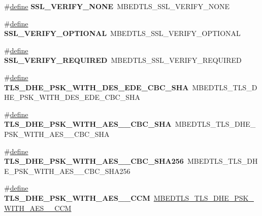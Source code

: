 \begin{DoxyCompactItemize}
\#\hyperlink{structdefine}{define} {\bfseries S\+S\+L\+\_\+\+V\+E\+R\+I\+F\+Y\+\_\+\+N\+O\+NE}~M\+B\+E\+D\+T\+L\+S\+\_\+\+S\+S\+L\+\_\+\+V\+E\+R\+I\+F\+Y\+\_\+\+N\+O\+NE
\item 
\mbox{\label{compat-1_83_8h_a7760ecdb03ee6f4520a21c04942c0883}} 
\#\hyperlink{structdefine}{define} {\bfseries S\+S\+L\+\_\+\+V\+E\+R\+I\+F\+Y\+\_\+\+O\+P\+T\+I\+O\+N\+AL}~M\+B\+E\+D\+T\+L\+S\+\_\+\+S\+S\+L\+\_\+\+V\+E\+R\+I\+F\+Y\+\_\+\+O\+P\+T\+I\+O\+N\+AL
\item 
\mbox{\label{compat-1_83_8h_a1f9549da00fa29209b3db3c5f11a329b}} 
\#\hyperlink{structdefine}{define} {\bfseries S\+S\+L\+\_\+\+V\+E\+R\+I\+F\+Y\+\_\+\+R\+E\+Q\+U\+I\+R\+ED}~M\+B\+E\+D\+T\+L\+S\+\_\+\+S\+S\+L\+\_\+\+V\+E\+R\+I\+F\+Y\+\_\+\+R\+E\+Q\+U\+I\+R\+ED
\item 
\mbox{\label{compat-1_83_8h_aac94b0631a635b24b6a8cddb4ba87fa9}} 
\#\hyperlink{structdefine}{define} {\bfseries T\+L\+S\+\_\+\+D\+H\+E\+\_\+\+P\+S\+K\+\_\+\+W\+I\+T\+H\+\_\+D\+E\+S\+\_\+\+E\+D\+E\+\_\+\+C\+B\+C\+\_\+\+S\+HA}~M\+B\+E\+D\+T\+L\+S\+\_\+\+T\+L\+S\+\_\+\+D\+H\+E\+\_\+\+P\+S\+K\+\_\+\+W\+I\+T\+H\+\_\+D\+E\+S\+\_\+\+E\+D\+E\+\_\+\+C\+B\+C\+\_\+\+S\+HA
\item 
\mbox{\label{compat-1_83_8h_a01627f31497f42e8d272161fa6973bf6}} 
\#\hyperlink{structdefine}{define} {\bfseries T\+L\+S\+\_\+\+D\+H\+E\+\_\+\+P\+S\+K\+\_\+\+W\+I\+T\+H\+\_\+\+A\+E\+S\+\_\+\_\+\+C\+B\+C\+\_\+\+S\+HA}~M\+B\+E\+D\+T\+L\+S\+\_\+\+T\+L\+S\+\_\+\+D\+H\+E\+\_\+\+P\+S\+K\+\_\+\+W\+I\+T\+H\+\_\+\+A\+E\+S\+\_\+\_\+\+C\+B\+C\+\_\+\+S\+HA
\item 
\mbox{\label{compat-1_83_8h_a200c5f9cdf24c011caaf60e67b35428c}} 
\#\hyperlink{structdefine}{define} {\bfseries T\+L\+S\+\_\+\+D\+H\+E\+\_\+\+P\+S\+K\+\_\+\+W\+I\+T\+H\+\_\+\+A\+E\+S\+\_\+\_\+\+C\+B\+C\+\_\+\+S\+H\+A256}~M\+B\+E\+D\+T\+L\+S\+\_\+\+T\+L\+S\+\_\+\+D\+H\+E\+\_\+\+P\+S\+K\+\_\+\+W\+I\+T\+H\+\_\+\+A\+E\+S\+\_\+\_\+\+C\+B\+C\+\_\+\+S\+H\+A256
\item 
\mbox{\label{compat-1_83_8h_a101bea173d3f5af2e2711f2f9c931d98}} 
\#\hyperlink{structdefine}{define} {\bfseries T\+L\+S\+\_\+\+D\+H\+E\+\_\+\+P\+S\+K\+\_\+\+W\+I\+T\+H\+\_\+\+A\+E\+S\+\_\+\_\+\+C\+CM}~\hyperlink{ssl__ciphersuites_8h_a6da1d7d8f20ef360a23d5bd481359b90}{M\+B\+E\+D\+T\+L\+S\+\_\+\+T\+L\+S\+\_\+\+D\+H\+E\+\_\+\+P\+S\+K\+\_\+\+W\+I\+T\+H\+\_\+\+A\+E\+S\+\_\+\_\+\+C\+CM}

\end{DoxyCompactItemize}
